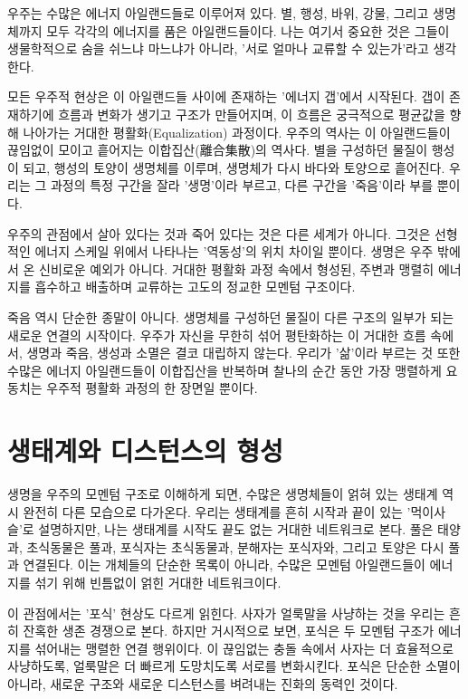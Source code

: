 \documentclass[12pt,a4paper]{article}
\begin{document}
우주는 수많은 에너지 아일랜드들로 이루어져 있다. 별, 행성, 바위, 강물, 그리고 생명체까지 모두 각각의 에너지를 품은 아일랜드들이다. 나는 여기서 중요한 것은 그들이 생물학적으로 숨을 쉬느냐 마느냐가 아니라, '서로 얼마나 교류할 수 있는가'라고 생각한다.

모든 우주적 현상은 이 아일랜드들 사이에 존재하는 '에너지 갭'에서 시작된다. 갭이 존재하기에 흐름과 변화가 생기고 구조가 만들어지며, 이 흐름은 궁극적으로 평균값을 향해 나아가는 거대한 평활화(Equalization) 과정이다. 우주의 역사는 이 아일랜드들이 끊임없이 모이고 흩어지는 이합집산(離合集散)의 역사다. 별을 구성하던 물질이 행성이 되고, 행성의 토양이 생명체를 이루며, 생명체가 다시 바다와 토양으로 흩어진다. 우리는 그 과정의 특정 구간을 잘라 '생명'이라 부르고, 다른 구간을 '죽음'이라 부를 뿐이다.

우주의 관점에서 살아 있다는 것과 죽어 있다는 것은 다른 세계가 아니다. 그것은 선형적인 에너지 스케일 위에서 나타나는 '역동성'의 위치 차이일 뿐이다. 생명은 우주 밖에서 온 신비로운 예외가 아니다. 거대한 평활화 과정 속에서 형성된, 주변과 맹렬히 에너지를 흡수하고 배출하며 교류하는 고도의 정교한 모멘텀 구조이다.

죽음 역시 단순한 종말이 아니다. 생명체를 구성하던 물질이 다른 구조의 일부가 되는 새로운 연결의 시작이다. 우주가 자신을 무한히 섞어 평탄화하는 이 거대한 흐름 속에서, 생명과 죽음, 생성과 소멸은 결코 대립하지 않는다. 우리가 '삶'이라 부르는 것 또한 수많은 에너지 아일랜드들이 이합집산을 반복하며 찰나의 순간 동안 가장 맹렬하게 요동치는 우주적 평활화 과정의 한 장면일 뿐이다.

\section{생태계와 디스턴스의 형성}
생명을 우주의 모멘텀 구조로 이해하게 되면, 수많은 생명체들이 얽혀 있는 생태계 역시 완전히 다른 모습으로 다가온다. 우리는 생태계를 흔히 시작과 끝이 있는 '먹이사슬'로 설명하지만, 나는 생태계를 시작도 끝도 없는 거대한 네트워크로 본다. 풀은 태양과, 초식동물은 풀과, 포식자는 초식동물과, 분해자는 포식자와, 그리고 토양은 다시 풀과 연결된다. 이는 개체들의 단순한 목록이 아니라, 수많은 모멘텀 아일랜드들이 에너지를 섞기 위해 빈틈없이 얽힌 거대한 네트워크이다.

이 관점에서는 '포식' 현상도 다르게 읽힌다. 사자가 얼룩말을 사냥하는 것을 우리는 흔히 잔혹한 생존 경쟁으로 본다. 하지만 거시적으로 보면, 포식은 두 모멘텀 구조가 에너지를 섞어내는 맹렬한 연결 행위이다. 이 끊임없는 충돌 속에서 사자는 더 효율적으로 사냥하도록, 얼룩말은 더 빠르게 도망치도록 서로를 변화시킨다. 포식은 단순한 소멸이 아니라, 새로운 구조와 새로운 디스턴스를 벼려내는 진화의 동력인 것이다.
\end{document}
